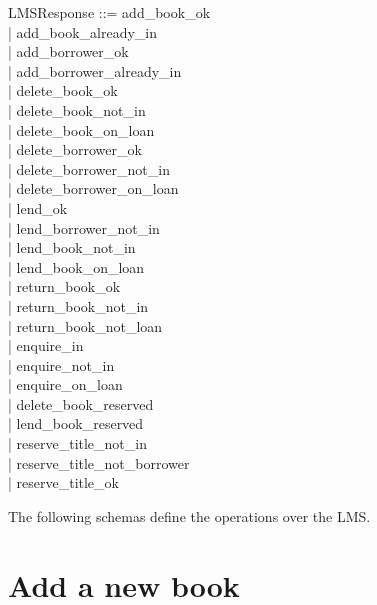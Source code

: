 \documentclass[11pt, fuzz]{article}
\begin{document}
\begin{zed}
    LMSResponse ::= add\_book\_ok               \\
                  | add\_book\_already\_in      \\
                  | add\_borrower\_ok           \\
                  | add\_borrower\_already\_in  \\
                  | delete\_book\_ok            \\
                  | delete\_book\_not\_in       \\
                  | delete\_book\_on\_loan      \\
                  | delete\_borrower\_ok        \\
                  | delete\_borrower\_not\_in   \\
                  | delete\_borrower\_on\_loan  \\
                  | lend\_ok                    \\
                  | lend\_borrower\_not\_in     \\
                  | lend\_book\_not\_in         \\
                  | lend\_book\_on\_loan        \\
                  | return\_book\_ok            \\
                  | return\_book\_not\_in       \\
                  | return\_book\_not\_loan     \\
                  | enquire\_in                 \\
                  | enquire\_not\_in            \\
                  | enquire\_on\_loan           \\
                  | delete\_book\_reserved      \\
                  | lend\_book\_reserved        \\
                  | reserve\_title\_not\_in     \\
                  | reserve\_title\_not\_borrower     \\
                  | reserve\_title\_ok          \\
\end{zed}


The following schemas define the operations over the LMS. 

\section{Add a new book}
\end{document}
